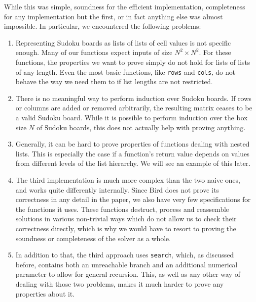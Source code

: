 \documentclass[a4paper,11pt]{article}
\begin{document}
While this was simple, soundness for the efficient implementation, completeness for any implementation but the first, or in fact anything else was almost impossible. In particular, we encountered the following problems:
\begin{enumerate}
  \item Representing Sudoku boards as lists of lists of cell values is not specific enough. Many of our functions expect inputs of size \(N^2 \times N^2\). For these functions, the properties we want to prove simply do not hold for lists of lists of any length. Even the most basic functions, like \texttt{rows} and \texttt{cols}, do not behave the way we need them to if list lengths are not restricted.
  \item There is no meaningful way to perform induction over Sudoku boards. If rows or columns are added or removed arbitrarily, the resulting matrix ceases to be a valid Sudoku board. While it is possible to perform induction over the box size $N$ of Sudoku boards, this does not actually help with proving anything.
  \item Generally, it can be hard to prove properties of functions dealing with nested lists. This is especially the case if a function's return value depends on values from different levels of the list hierarchy. We will see an example of this later.
  \item The third implementation is much more complex than the two naive ones, and works quite differently internally. Since Bird does not prove its correctness in any detail in the paper, we also have very few specifications for the functions it uses. These functions destruct, process and reassemble solutions in various non-trivial ways which do not allow us to check their correctness directly, which is why we would have to resort to proving the soundness or completeness of the solver as a whole.
  \item In addition to that, the third approach uses \texttt{search}, which, as discussed before, contains both an unreachable branch and an additional numerical parameter to allow for general recursion. This, as well as any other way of dealing with those two problems, makes it much harder to prove any properties about it.
\end{enumerate}
\end{document}
